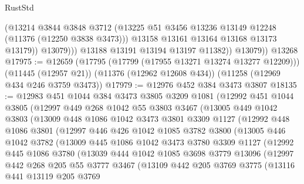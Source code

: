 \begin{lexlean}{RustStd}
\begin{coremodule}
{\begin{coremodule}
{{{{{{{{{{{{{{{{{{{{{{{{{{{{{{{{{{{{{{{{{{{{{{{{{{{{{{{{{{{{{{{{{{{{{{{{{{{{{{{{{{{{{                    (@13214
                      @3844
                      @3848
                      @3712
                      (@13225 @51 @3456 @13236 @13149 @12248 (@11376 (@12250 @3838 @3473)))
                      @13158
                      @13161
                      @13164
                      @13168
                      @13173
                      @13179))
                  @13079)))
            @13188
            @13191
            @13194
            @13197
            @11382))
        @13079))
    @13268
@17975 := @12659
    (@17795 (@17799 (@17955 @13271 @13274 @13277 @12209)))
    (@11445 (@12957 @21))
    (@11376 (@12962 @12608 @434))
    (@11258 (@12969 @434 @246 @3759 @3473))
@17979 := @12976 @452 @384 @3473 @3807
@18135 := @12983
    @451
    @1044
    @384
    @3473
    @3805
    @3209
    @1081
    (@12992
      @451
      @1044
      @3805
      (@12997
        @449
        @268
        @1042
        @55
        @3803
        @3467
        (@13005
          @449
          @1042
          @3803
          (@13009
            @448
            @1086
            @1042
            @3473
            @3801
            @3309
            @1127
            (@12992
              @448
              @1086
              @3801
              (@12997
                @446
                @426
                @1042
                @1085
                @3782
                @3800
                (@13005
                  @446
                  @1042
                  @3782
                  (@13009
                    @445
                    @1086
                    @1042
                    @3473
                    @3780
                    @3309
                    @1127
                    (@12992
                      @445
                      @1086
                      @3780
                      (@13039
                        @444
                        @1042
                        @1085
                        @3698
                        @3779
                        @13096
                        (@12997
                          @442
                          @268
                          @205
                          @55
                          @3777
                          @3467
                          (@13109
                            @442
                            @205
                            @3769
                            @3775
                            (@13116
                              @441
                              @13119
                              @205
                              @3769
}}}}}}}}}}}}}}}}}}}}}}}}}}}}}}}}}}}}}}}}}}}}}}}}}}}}}}}}}}}}}}}}}}}}}}}}}}}}}}}}}}}}}
\end{coremodule}}
\end{coremodule}
\end{lexlean}

